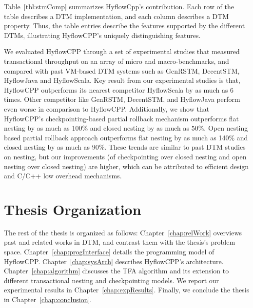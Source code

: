 \documentclass[12pt,english]{report}
\begin{document}
Table~\ref{tbl:stmComp} summarizes HyflowCpp's contribution. Each row of the table describes a DTM implementation, and each column describes a DTM property. Thus, the table entries describe the features supported by the different DTMs, illustrating HyflowCPP's uniquely distinguishing features. 


We evaluated HyflowCPP through a set of experimental studies that measured transactional throughput on an array of micro and macro-benchmarks, and compared with past VM-based DTM systems such as GenRSTM, DecentSTM, HyflowJava and HyflowScala.
Key result from our experimental studies is that, HyflowCPP outperforms its nearest competitor HyflowScala
by as much as 6 times. Other competitor like GenRSTM, DecentSTM, and HyflowJava perform even worse in comparison to HyflowCPP.
Additionally, we show that HyflowCPP's checkpointing-based partial rollback mechanism outperforms flat nesting by as much as 100\% and closed nesting by as much as 50\%. Open nesting based partial rollback approach outperforms flat nesting by as much as 140\% and closed nesting by as much as 90\%.
These trends are similar to past DTM studies on nesting, 
but our improvements (of checkpointing over closed nesting and open nesting over closed nesting) are  higher, which can be attributed to efficient design and C/C++ low overhead mechanisms. 

\section{Thesis Organization}

The rest of the thesis is organized as follows: Chapter~\ref{chap:relWork} overviews past and related works in DTM, and contrast them with the thesis's problem space. Chapter~\ref{chap:progInterface} details the programming model of HyflowCPP. Chapter~\ref{chap:sysArch} describes HyflowCPP's architecture. Chapter~\ref{chap:algorithm} discusses the TFA algorithm and its extension to different transactional nesting and checkpointing models. We report our experimental results in Chapter~\ref{chap:expResults}. Finally, we conclude the thesis in Chapter~\ref{chap:conclusion}.


\end{document}
